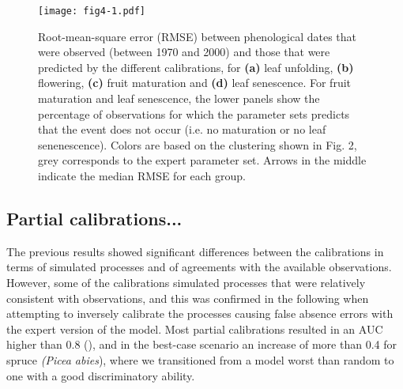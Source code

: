 \documentclass[letterpaper,8pt]{extarticle}  %
\begin{document}
\begin{doublespacing}
\begin{linenumbers}

\begin{figure}[htpb]
\hspace*{-1cm}
\centering
\begin{subcaptiongroup}
\label{fig:3A} 
\label{fig:3B}
\label{fig:3C}
\label{fig:3D}
\label{fig:3E}
\end{subcaptiongroup}
\texttt{[image: fig4-1.pdf]}
\caption{Root-mean-square error (RMSE) between phenological dates that were observed (between 1970 and 2000) and those that were predicted by the different calibrations, for \textbf{(a)} leaf unfolding, \textbf{(b)} flowering, \textbf{(c)} fruit maturation and \textbf{(d)} leaf senescence. For fruit maturation and leaf senescence, the lower panels show the percentage of observations for which the parameter sets predicts that the event does not occur (i.e. no maturation or no leaf senenescence). Colors are based on the clustering shown in Fig. 2, grey corresponds to the expert parameter set. Arrows in the middle indicate the median RMSE for each group.}
\label{fig:3}
\end{figure}

\subsection{Partial calibrations...}

The previous results showed significant differences between the calibrations in terms of simulated processes and of agreements with the available observations. However, some of the calibrations simulated processes that were relatively consistent with observations, and this was confirmed in the following when attempting to inversely calibrate the processes causing false absence errors with the expert version of the model. Most partial calibrations resulted in an AUC higher than 0.8 (), and in the best-case scenario an increase of more than 0.4 for spruce \emph{(Picea abies}), where we transitioned from a model worst than random to one with a good discriminatory ability.


\end{linenumbers}
\end{doublespacing}
\end{document}

